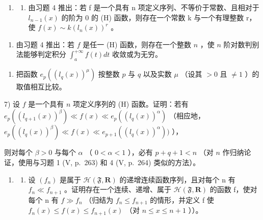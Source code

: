 \begin{enumerate}
\def\labelenumi{\arabic{enumi})}
\setcounter{enumi}{4}
\tightlist
\item
  \begin{enumerate}
  \def\labelenumii{\alph{enumii})}
  \tightlist
  \item
    由习题 4 推出：若 f 是一个具有 n 项定义序列、不等价于常数、且相对于 \(l_{n-1}(x)\) 的阶为 0 的 (H) 函数，则存在一个常数 k 与一个有理整数 r，使 \(f(x) \sim k(l_n(x))^r\) 。
  \end{enumerate}
\end{enumerate}

\begin{enumerate}
\def\labelenumi{\alph{enumi})}
\setcounter{enumi}{1}
\tightlist
\item
  由习题 4 推出：若 \(f\) 是任一 (H) 函数，则存在一个整数 \(n\) ，使 \(n\) 阶对数判别法能够判定积分 \(\int_{a}^{+\infty} f(t) dt\) 收敛或为无穷。
\end{enumerate}

\begin{enumerate}
\def\labelenumi{\arabic{enumi})}
\setcounter{enumi}{5}
\tightlist
\item
  把函数 \(e_p\left((l_q(x))^{\mu}\right)\) 按整数 \(p\) 与 \(q\) 以及实数 \(\mu\) （设其 \(> 0\) 且 \(\neq 1\) ）的取值相互比较。
\end{enumerate}

7) 设 \(f\) 是一个具有 \(n\) 项定义序列的 (H) 函数。证明：若有 \(e_p((l_{q+1}(x))^{\beta}) \ll f(x) \ll e_p((l_q(x))^{\alpha})\) （相应地， \(e_p((l_q(x))^{\beta}) \ll f(x) \ll e_{p+1}((l_q(x))^{\alpha}))\) ），

则对每个 \(\beta > 0\) 与每个 \(\alpha\) （ \(0 < \alpha < 1\) ），必有 \(p + q + 1 < n\) （对 \(n\) 作归纳论证，使用与习题 1 (V, p.~263) 和 4 (V, p.~264) 类似的方法）。

\begin{enumerate}
\def\labelenumi{\arabic{enumi})}
\setcounter{enumi}{7}
\tightlist
\item
  \begin{enumerate}
  \def\labelenumii{\alph{enumii})}
  \tightlist
  \item
    设 \((f_{n})\) 是属于 \(\mathcal{H}(\mathfrak{F},\mathbf{R})\) 的递增连续函数序列，且对每个 n 有 \(f_{n} \ll f_{n+1}\) 。证明存在一个连续、递增、属于 \(\mathcal{H}(\mathfrak{F},\mathbf{R})\) 的函数 f，使对每个 n 有 \(f \gg f_{n}\) （归结为 \(f_{n} \leqslant f_{n+1}\) 的情形，并定义 f 使 \(f_{n}(x) \leqslant f(x) \leqslant f_{n+1}(x)\) （对 \(n \leqslant x \leqslant n+1\) ））。
  \end{enumerate}
\end{enumerate}

